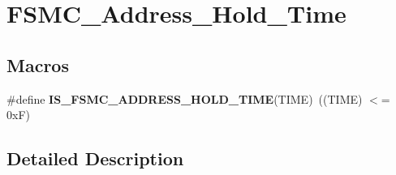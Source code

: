 \hypertarget{group___f_s_m_c___address___hold___time}{}\section{F\+S\+M\+C\+\_\+\+Address\+\_\+\+Hold\+\_\+\+Time}
\label{group___f_s_m_c___address___hold___time}
\subsection*{Macros}
\begin{DoxyCompactItemize}
\item 
\hypertarget{group___f_s_m_c___address___hold___time_gae7d031a5b95ad00acf67e9bc95064998}{}\#define {\bfseries I\+S\+\_\+\+F\+S\+M\+C\+\_\+\+A\+D\+D\+R\+E\+S\+S\+\_\+\+H\+O\+L\+D\+\_\+\+T\+I\+M\+E}(T\+I\+M\+E)~((T\+I\+M\+E) $<$= 0x\+F)\label{group___f_s_m_c___address___hold___time_gae7d031a5b95ad00acf67e9bc95064998}

\end{DoxyCompactItemize}


\subsection{Detailed Description}
